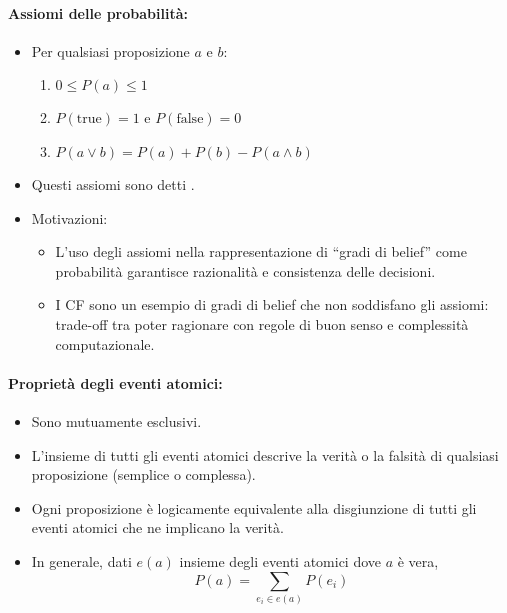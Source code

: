 \paragraph{Assiomi delle probabilità:}

\begin{itemize}
  \item Per qualsiasi proposizione $a$ e $b$: 
    \begin{enumerate}
      \item $0 \leq P(a) \leq 1$
      \item $P(\text{true}) = 1$ \quad e \quad $P(\text{false}) = 0$
      \item $P(a \lor b) = P(a) + P(b) - P(a \land b)$
    \end{enumerate}
  \item Questi assiomi sono detti .
  \item Motivazioni:
    \begin{itemize}
      \item L’uso degli assiomi nella rappresentazione di “gradi di belief” come probabilità garantisce razionalità e consistenza delle decisioni.
      \item I CF sono un esempio di gradi di belief che non soddisfano gli assiomi: trade-off tra poter ragionare con regole di buon senso e complessità computazionale.
    \end{itemize}
\end{itemize}


\paragraph{Proprietà degli eventi atomici:}

\begin{itemize}
  \item Sono mutuamente esclusivi. 
  \item L'insieme di tutti gli eventi atomici descrive la verità o la falsità di qualsiasi proposizione (semplice o complessa). 
  \item Ogni proposizione è logicamente equivalente alla disgiunzione di tutti gli eventi atomici che ne implicano la verità. 
  \item In generale, dati $e(a)$ insieme degli eventi atomici dove $a$ è vera, $$P(a) = \displaystyle\sum_{e_i \in e(a)} P(e_i)$$ 
\end{itemize}

